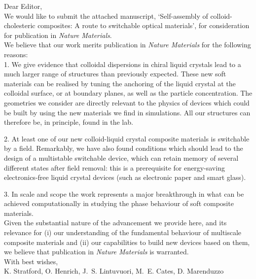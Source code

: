 \documentclass[12pt]{article}
\begin{document}
Dear Editor,\\

We would like to submit the attached manuscript, `Self-assembly of 
colloid-cholesteric composites: A route to switchable optical materials', 
for consideration for publication in {\it Nature Materials}. \\

We believe that our work merits publication in {\it Nature Materials} for the following reasons:\\

1. We give evidence that colloidal dispersions in chiral liquid 
crystals lead to a much larger range of structures than previously
expected. These new soft materials can be realised by tuning
the anchoring of the liquid crystal at the colloidal surface,
or at boundary planes, as well as the particle concentration. 
The geometries we consider are directly 
relevant to the physics of devices which could be built by
using the new materials we find in simulations. All our
structures can therefore be, in principle, found in the lab.

2.  At least one of our new colloid-liquid crystal composite materials 
is switchable by a field. Remarkably, we have also found conditions which 
should lead to the design of a multistable switchable device, which can
retain memory of several different states after field removal:
this is a prerequisite for energy-saving electronics-free
liquid crystal devices (such as electronic paper and smart glass).

3. In scale and scope the work represents a major breakthrough in what 
can be achieved computationally in studying the phase behaviour of soft 
composite materials. \\

Given the substantial nature of the advancement we provide here, 
and its relevance for (i) our understanding of the fundamental behaviour
of multiscale composite materials and (ii) our capabilities to build new
devices based on them, we believe that publication in 
{\it Nature Materials} is warranted.\\

With best wishes,\\

K. Stratford, O. Henrich, J.~S. Lintuvuori, M.~E. Cates, D. Marenduzzo
\end{document}
